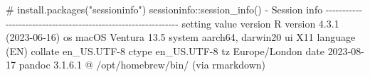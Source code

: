 \documentclass[
  10pt,
  a4paper,
]{book}
\newenvironment{Shaded}{\begin{snugshade}}{\end{snugshade}}
\newcommand{\CommentTok}[1]{\textcolor[rgb]{0.37,0.37,0.37}{#1}}
\newcommand{\DecValTok}[1]{\textcolor[rgb]{0.68,0.00,0.00}{#1}}
\newcommand{\ErrorTok}[1]{\textcolor[rgb]{0.68,0.00,0.00}{#1}}
\newcommand{\FloatTok}[1]{\textcolor[rgb]{0.68,0.00,0.00}{#1}}
\newcommand{\FunctionTok}[1]{\textcolor[rgb]{0.28,0.35,0.67}{#1}}
\newcommand{\NormalTok}[1]{\textcolor[rgb]{0.00,0.46,0.62}{#1}}
\newcommand{\SpecialCharTok}[1]{\textcolor[rgb]{0.37,0.37,0.37}{#1}}
\begin{document}
\begin{Shaded}
\begin{Highlighting}[]
\CommentTok{\# install.packages("sessioninfo")}
\NormalTok{sessioninfo}\SpecialCharTok{::}\FunctionTok{session\_info}\NormalTok{()}
\SpecialCharTok{{-}}\NormalTok{ Session info }\SpecialCharTok{{-}{-}{-}{-}{-}{-}{-}{-}{-}{-}{-}{-}{-}{-}{-}{-}{-}{-}{-}{-}{-}{-}{-}{-}{-}{-}{-}{-}{-}{-}{-}{-}{-}{-}{-}{-}{-}{-}{-}{-}{-}{-}{-}{-}{-}{-}{-}{-}{-}{-}{-}{-}{-}{-}{-}{-}{-}{-}{-}{-}{-}{-}{-}}
\NormalTok{ setting  value}
\NormalTok{ version  R version }\DecValTok{4}\NormalTok{.}\FloatTok{3.1}\NormalTok{ (}\DecValTok{2023{-}06{-}16}\NormalTok{)}
\NormalTok{ os       macOS Ventura }\FloatTok{13.5}
\NormalTok{ system   aarch64, darwin20}
\NormalTok{ ui       X11}
 \FunctionTok{language}\NormalTok{ (EN)}
\NormalTok{ collate  en\_US.UTF}\DecValTok{{-}8}
\NormalTok{ ctype    en\_US.UTF}\DecValTok{{-}8}
\NormalTok{ tz       Europe}\SpecialCharTok{/}\NormalTok{London}
\NormalTok{ date     }\DecValTok{2023{-}08{-}17}
\NormalTok{ pandoc   }\DecValTok{3}\NormalTok{.}\DecValTok{1}\NormalTok{.}\FloatTok{6.1} \SpecialCharTok{@} \ErrorTok{/}\NormalTok{opt}\SpecialCharTok{/}\NormalTok{homebrew}\SpecialCharTok{/}\NormalTok{bin}\SpecialCharTok{/}\NormalTok{ (via rmarkdown)}


\end{Highlighting}
\end{Shaded}
\end{document}
